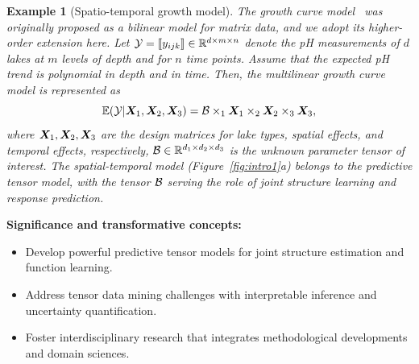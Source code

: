 \documentclass[11pt]{article}
\DeclareRobustCommand{\mybox}[2][gray!20]{%
\begin{tcolorbox}[   %
        breakable,
        left=0pt,
        right=0pt,
        top=0pt,
        bottom=0pt,
        colback=#1,
        colframe=#1,
        width=\dimexpr\textwidth\relax, 
        enlarge left by=0mm,
        boxsep=5pt,
        arc=0pt,outer arc=0pt,
        ]
        #2
\end{tcolorbox}}
\DeclareRobustCommand{\mybox}[2][gray!20]{%
\begin{tcolorbox}[   %
        breakable,
        left=0pt,
        right=0pt,
        top=0pt,
        bottom=0pt,
        colback=#1,
        colframe=#1,
        width=\dimexpr\textwidth\relax, 
        enlarge left by=0mm,
        boxsep=5pt,
        arc=0pt,outer arc=0pt,
        ]
        #2
\end{tcolorbox}
}
\theoremstyle{exampstyle}
\newtheorem{example}{Example}[section]
\theoremstyle{definition}
\begin{document}
\begin{example}[Spatio-temporal growth model]\label{ex:1}
The growth curve model~\cite{gabriel1998generalised} was originally proposed as a bilinear model for matrix data, and we adopt its higher-order extension here. Let $\mathcal{Y}=\llbracket y_{ijk} \rrbracket\in\mathbb{R}^{d \times m\times n}$ denote the pH measurements of $d$ lakes at $m$ levels of depth and for $n$ time points. %
Assume that the expected pH trend is polynomial in depth and in time. Then, the multilinear growth curve model is represented as
\begin{equation}\label{eq:time}
\mathbb{E}(\tY|\mX_1,\mX_2,\mX_3)=\tB\times_1\mX_1\times_2 \mX_2\times_3 \mX_3,
\vspace{-.15cm}
\end{equation}
where $\bm X_1, \bm X_2, \bm X_3$
are the design matrices for lake types, spatial effects, and temporal effects, respectively, $\mathcal{B}\in\mathbb{R}^{d_1\times d_2\times d_3}$ is the unknown parameter tensor of interest. The spatial-temporal model (Figure~\ref{fig:intro1}a) belongs to the predictive tensor model, with the tensor $\mathcal{B}$ serving the role of joint structure learning and response prediction. 
\end{example}
\mybox[gray!20]{{\bf Significance and transformative concepts:} 
\begin{itemize}[leftmargin=*]
\item Develop powerful predictive tensor models for joint structure estimation and function learning. 
\item Address tensor data mining challenges with interpretable inference and uncertainty quantification. 
\item Foster interdisciplinary research that integrates methodological developments and domain sciences.
\end{itemize}
}
  \vspace{-.3cm}
\end{document}
